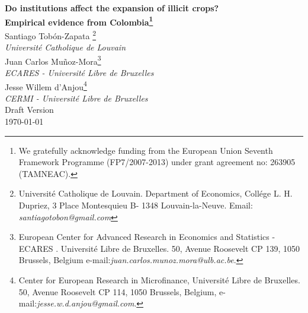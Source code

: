 \documentclass[12pt,a4paper,english]{article}%
\begin{document}
\begin{center}
\textbf{{\Huge Do institutions affect the expansion of illicit crops? } \\ \Large Empirical evidence from Colombia\footnote{We gratefully acknowledge funding from the European Union Seventh Framework Programme (FP7/2007-2013) under grant agreement no: 263905 (TAMNEAC).} }\\[0.5cm]

{\large Santiago Tob\'on-Zapata \footnote{ Universit\'e Catholique de Louvain. Department of Economics, Coll\'ege L. H. Dupriez, 3 Place Montesquieu B- 1348 Louvain-la-Neuve. Email: \textit{santiagotobon@gmail.com}} \\ \normalsize \textit{Universit\'e Catholique de Louvain}}\\[0.5cm]

{\large Juan Carlos Mu\~noz-Mora\footnote{European Center for Advanced Research in Economics and Statistics -ECARES . Universit\'e Libre de Bruxelles. 50, Avenue Roosevelt CP 139, 1050 Brussels, Belgium  e-mail:\textit{juan.carlos.munoz.mora@ulb.ac.be}.}  \\ \normalsize \textit{ECARES - Universit\'e Libre de Bruxelles}}\\[0.5cm]

{\large Jesse Willem d'Anjou\footnote{Center for European Research in Microfinance, Universit\'e Libre de Bruxelles. 50, Avenue Roosevelt CP 114, 1050 Brussels, Belgium, e-mail:\textit{jesse.w.d.anjou@gmail.com}.}  \\ \normalsize \textit{CERMI - Universit\'e Libre de Bruxelles}}\\[1.5cm]
{\large Draft Version }\\
\large \today 
\end{center}
\end{document}
